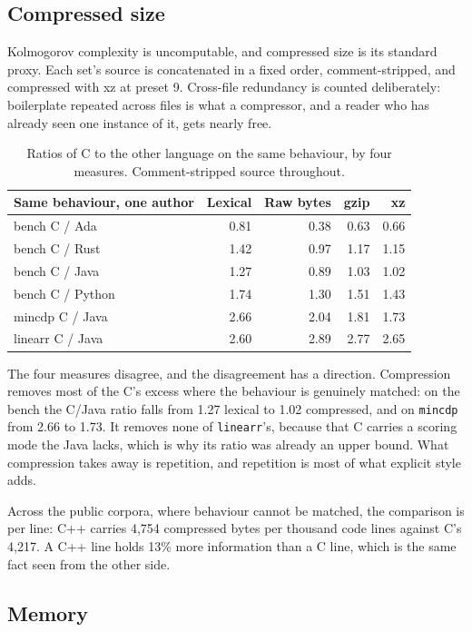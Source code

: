 \documentclass[11pt,a4paper]{article}
\begin{document}
\subsection{Compressed size}

Kolmogorov complexity is uncomputable, and compressed size is its standard proxy. Each set's source is concatenated in a fixed order, comment-stripped, and compressed with xz at preset 9. Cross-file redundancy is counted deliberately: boilerplate repeated across files is what a compressor, and a reader who has already seen one instance of it, gets nearly free.

\begin{table}[H]
\centering
\small
\begin{tabular}{lrrrr}
\toprule
Same behaviour, one author & Lexical & Raw bytes & gzip & xz \\
\midrule
bench C / Ada & 0.81 & 0.38 & 0.63 & 0.66 \\
bench C / Rust & 1.42 & 0.97 & 1.17 & 1.15 \\
bench C / Java & 1.27 & 0.89 & 1.03 & 1.02 \\
bench C / Python & 1.74 & 1.30 & 1.51 & 1.43 \\
mincdp C / Java & 2.66 & 2.04 & 1.81 & 1.73 \\
linearr C / Java & 2.60 & 2.89 & 2.77 & 2.65 \\
\bottomrule
\end{tabular}
\caption{Ratios of C to the other language on the same behaviour, by four measures. Comment-stripped source throughout.}
\label{tab:comp}
\end{table}

The four measures disagree, and the disagreement has a direction. Compression removes most of the C's excess where the behaviour is genuinely matched: on the bench the C/Java ratio falls from 1.27 lexical to 1.02 compressed, and on \texttt{mincdp} from 2.66 to 1.73. It removes none of \texttt{linearr}'s, because that C carries a scoring mode the Java lacks, which is why its ratio was already an upper bound. What compression takes away is repetition, and repetition is most of what explicit style adds.

Across the public corpora, where behaviour cannot be matched, the comparison is per line: C++ carries 4,754 compressed bytes per thousand code lines against C's 4,217. A C++ line holds 13\% more information than a C line, which is the same fact seen from the other side.

\subsection{Memory}
\end{document}
